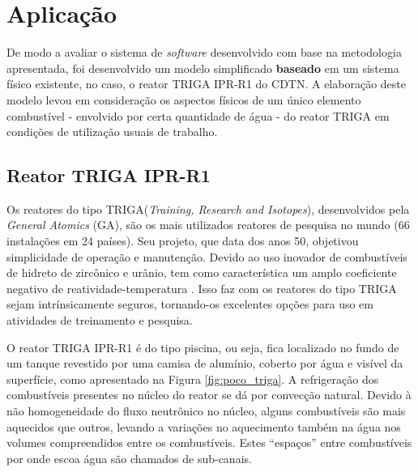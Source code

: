 \chapter{Aplicação}
\label{chap:aplicacao}

De modo a avaliar o sistema de \textit{software} desenvolvido com base na metodologia apresentada, 
foi desenvolvido um modelo simplificado \textbf{baseado} em um sistema físico existente, no caso,
o reator TRIGA IPR-R1 do CDTN. A elaboração deste modelo levou em consideração os aspectos físicos
de um único elemento combustível - envolvido por certa quantidade de água - do reator TRIGA
em condições de utilização usuais de trabalho.

\section{Reator TRIGA IPR-R1}
\label{sec:triga}


Os reatores do tipo TRIGA\textregistered (\textit{Training, Research and Isotopes}),
desenvolvidos pela \textit{General Atomics} (GA), são os mais utilizados
reatores de pesquisa no mundo (66 instalações em 24 países). Seu projeto, que data dos anos 50,
objetivou simplicidade de operação e manutenção. Devido ao uso inovador de combustíveis de hidreto
de zircônico e urânio, tem como característica um amplo coeficiente negativo
de reatividade-temperatura \cite[Capítulo~1]{Veloso2005}. Isso faz com os reatores do tipo TRIGA sejam
intrínsicamente seguros, tornando-os excelentes opções para uso em atividades de treinamento
e pesquisa.


O reator TRIGA IPR-R1 é do tipo piscina, ou seja, fica localizado no fundo de um tanque revestido por uma
camisa de alumínio, coberto por água e visível da superfície, como apresentado na Figura \ref{fig:poco_triga}.
A refrigeração dos combustíveis presentes no núcleo do reator se dá por convecção natural. Devido à não homogeneidade
do fluxo neutrônico no núcleo, alguns combustíveis são mais aquecidos que outros, levando a variações
no aquecimento também na água nos volumes compreendidos entre os combustíveis. Estes ``espaços'' entre
combustíveis por onde escoa água são chamados de sub-canais.

